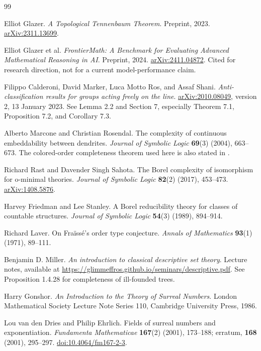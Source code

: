 \documentclass[11pt,a4paper]{article}
\numberwithin{equation}{section}
\theoremstyle{definition}
\theoremstyle{remark}
\begin{document}
\begin{thebibliography}{99}
\raggedright

Elliot Glazer.
\emph{A Topological Tennenbaum Theorem}.
Preprint, 2023. \href{https://arxiv.org/abs/2311.13699}{arXiv:2311.13699}.

Elliot Glazer et al.
\emph{FrontierMath: A Benchmark for Evaluating Advanced Mathematical
Reasoning in AI}.
Preprint, 2024. \href{https://arxiv.org/abs/2411.04872}{arXiv:2411.04872}.
Cited for research direction, not for a current model-performance claim.

Filippo Calderoni, David Marker, Luca Motto Ros, and Assaf Shani.
\emph{Anti-classification results for groups acting freely on the line}.
\href{https://arxiv.org/abs/2010.08049}{arXiv:2010.08049}, version 2,
13 January 2023. See Lemma 2.2 and Section 7, especially Theorem 7.1,
Proposition 7.2, and Corollary 7.3.

Alberto Marcone and Christian Rosendal.
The complexity of continuous embeddability between dendrites.
\emph{Journal of Symbolic Logic} \textbf{69}(3) (2004), 663--673.
The colored-order completeness theorem used here is also stated in
\cite[Theorem 7.1]{cmms}.

Richard Rast and Davender Singh Sahota.
The Borel complexity of isomorphism for o-minimal theories.
\emph{Journal of Symbolic Logic} \textbf{82}(2) (2017), 453--473.
\href{https://arxiv.org/abs/1408.5876}{arXiv:1408.5876}.

Harvey Friedman and Lee Stanley.
A Borel reducibility theory for classes of countable structures.
\emph{Journal of Symbolic Logic} \textbf{54}(3) (1989), 894--914.

Richard Laver.
On Fra\"iss\'e's order type conjecture.
\emph{Annals of Mathematics} \textbf{93}(1) (1971), 89--111.

Benjamin D. Miller.
\emph{An introduction to classical descriptive set theory}.
Lecture notes, available at
\url{https://glimmeffros.github.io/seminars/descriptive.pdf}.
See Proposition 1.4.28 for completeness of ill-founded trees.

Harry Gonshor.
\emph{An Introduction to the Theory of Surreal Numbers}.
London Mathematical Society Lecture Note Series 110,
Cambridge University Press, 1986.

Lou van den Dries and Philip Ehrlich.
Fields of surreal numbers and exponentiation.
\emph{Fundamenta Mathematicae} \textbf{167}(2) (2001), 173--188;
erratum, \textbf{168} (2001), 295--297.
\href{https://doi.org/10.4064/fm167-2-3}{doi:10.4064/fm167-2-3}.


\end{thebibliography}
\end{document}
